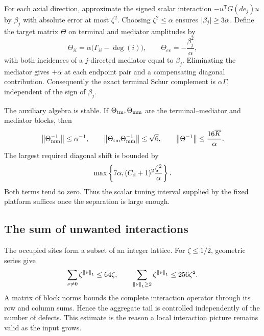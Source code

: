 For each axial direction, approximate the signed scalar interaction $-u^{\mathsf T}G(de_j)u$ by $\beta_j$ with absolute error at most $\zeta^2$. Choosing $\zeta^2\le\alpha$ ensures $\left\lvert \beta_j\right\rvert\ge3\alpha$. Define the target matrix $\Theta$ on terminal and mediator amplitudes by
\begin{equation}\label{d:eq:target-mediator}
 \Theta_{ii}=\alpha\bigl(\Gamma_{ii}-\deg(i)\bigr),\qquad
 \Theta_{ee}=-\frac{\beta_j^2}{\alpha},
\end{equation}
with both incidences of a $j$-directed mediator equal to $\beta_j$. Eliminating the mediator gives $+\alpha$ at each endpoint pair and a compensating diagonal contribution. Consequently the exact terminal Schur complement is $\alpha\Gamma$, independent of the sign of $\beta_j$.

The auxiliary algebra is stable. If $\Theta_{\rm tm},\Theta_{\rm mm}$ are the terminal--mediator and mediator blocks, then
\begin{equation}\label{d:eq:mediator-norms}
 \left\lVert \Theta_{\rm mm}^{-1}\right\rVert\le\alpha^{-1},\qquad
 \left\lVert \Theta_{\rm tm}\Theta_{\rm mm}^{-1}\right\rVert\le\sqrt6,\qquad
 \left\lVert \Theta^{-1}\right\rVert\le\frac{16\overline K}{\alpha}.
\end{equation}
The largest required diagonal shift is bounded by
\begin{equation}\label{d:eq:tuning-size}
 \max\left\{7\alpha,(C_{\rm d}+1)^2\frac{\zeta^2}{\alpha}\right\}.
\end{equation}
Both terms tend to zero. Thus the scalar tuning interval supplied by the fixed platform suffices once the separation is large enough.

\subsection{The sum of unwanted interactions}

The occupied sites form a subset of an integer lattice. For $\zeta\le1/2$, geometric series give
\begin{equation}\label{d:eq:lattice-tail}
 \sum_{\nu\ne0}\zeta^{\left\lVert \nu\right\rVert_1}\le64\zeta,
 \qquad
 \sum_{\left\lVert \nu\right\rVert_1\ge2}\zeta^{\left\lVert \nu\right\rVert_1}\le256\zeta^2.
\end{equation}
A matrix of block norms bounds the complete interaction operator through its row and column sums. Hence the aggregate tail is controlled independently of the number of defects. This estimate is the reason a local interaction picture remains valid as the input grows.

